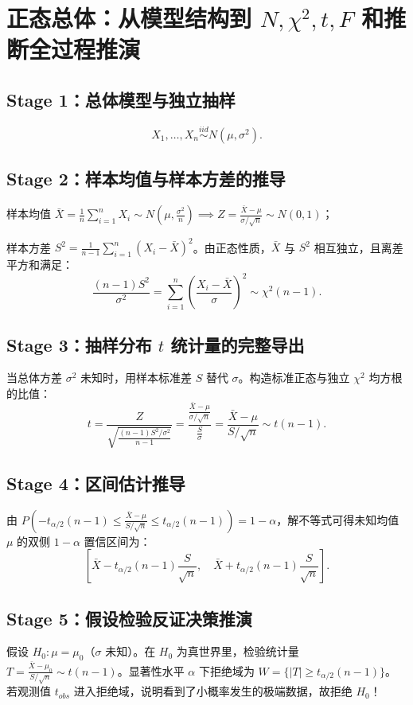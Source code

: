 \documentclass[11pt,a4paper,openany]{ctexbook}
\begin{document}
\section{正态总体：从模型结构到 $N,\chi^2,t,F$ 和推断全过程推演}
\subsection{Stage 1：总体模型与独立抽样}
\[
X_1,\dots,X_n\overset{iid}{\sim}N(\mu,\sigma^2).
\]

\subsection{Stage 2：样本均值与样本方差的推导}
样本均值 $\bar X = \frac{1}{n}\sum_{i=1}^n X_i \sim N\left(\mu, \frac{\sigma^2}{n}\right) \implies Z = \frac{\bar X - \mu}{\sigma/\sqrt{n}} \sim N(0,1)$；

样本方差 $S^2 = \frac{1}{n-1}\sum_{i=1}^n (X_i - \bar X)^2$。由正态性质，$\bar X$ 与 $S^2$ 相互独立，且离差平方和满足：
\[
\frac{(n-1)S^2}{\sigma^2} = \sum_{i=1}^n \left(\frac{X_i-\bar X}{\sigma}\right)^2 \sim \chi^2(n-1).
\]

\subsection{Stage 3：抽样分布 $t$ 统计量的完整导出}
当总体方差 $\sigma^2$ 未知时，用样本标准差 $S$ 替代 $\sigma$。构造标准正态与独立 $\chi^2$ 均方根的比值：
\[
t = \frac{Z}{\sqrt{\frac{(n-1)S^2/\sigma^2}{n-1}}} = \frac{\frac{\bar X - \mu}{\sigma/\sqrt n}}{\frac{S}{\sigma}} = \frac{\bar X - \mu}{S/\sqrt n} \sim t(n-1).
\]

\subsection{Stage 4：区间估计推导}
由 $P\left( -t_{\alpha/2}(n-1) \le \frac{\bar X - \mu}{S/\sqrt n} \le t_{\alpha/2}(n-1) \right) = 1-\alpha$，解不等式可得未知均值 $\mu$ 的双侧 $1-\alpha$ 置信区间为：
\[
\left[ \bar X - t_{\alpha/2}(n-1)\frac{S}{\sqrt n}, \quad \bar X + t_{\alpha/2}(n-1)\frac{S}{\sqrt n} \right].
\]

\subsection{Stage 5：假设检验反证决策推演}
假设 $H_0: \mu = \mu_0$（$\sigma$ 未知）。在 $H_0$ 为真世界里，检验统计量 $T = \frac{\bar X - \mu_0}{S/\sqrt n} \sim t(n-1)$。显著性水平 $\alpha$ 下拒绝域为 $W = \{ |T| \ge t_{\alpha/2}(n-1) \}$。若观测值 $t_{obs}$ 进入拒绝域，说明看到了小概率发生的极端数据，故拒绝 $H_0$！
\end{document}
